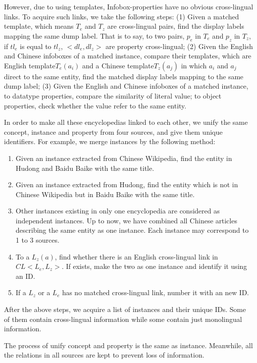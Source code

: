\documentclass[runningheads,a4paper]{llncs}
\begin{document}
However, due to using templates, Infobox-properties have no obvious cross-lingual links. To acquire such links, we take the following steps: (1) Given a matched template, which means $T_{e}$ and $T_{z}$ are cross-lingual pairs, find the display labels mapping the same dump label. That is to say, to two pairs, $p_{e}$ in $T_{e}$ and $p_{z}$ in $T_{z}$, if $tl_{e}$ is equal to $tl_{z}$, $<dl_{e},dl_{z}>$ are property cross-lingual; (2) Given the English and Chinese infoboxes of a matched instance, compare their templates, which are English template$T_{e}(a_{i})$ and a Chinese template$T_{z}(a_{j})$ in which $a_{i}$ and $a_{j}$ direct to the same entity, find the matched display labels mapping to the same dump label; (3) Given the English and Chinese infoboxes of a matched instance, to datatype properties, compare the similarity of literal value; to object properties, check whether the value refer to the same entity. 

In order to make all these encyclopedias linked to each other, we unify the same concept, instance and property from four sources, and give them unique identifiers. For example, we merge instances by the following method:

\begin{enumerate}[Step 1]
    \item Given an instance extracted from Chinese Wikipedia, find the entity in Hudong and Baidu Baike with the same title.
    \item Given an instance extracted from Hudong, find the entity which is not in Chinese Wikipedia but in Baidu Baike with the same title.
    \item Other instances existing in only one encyclopedia are considered as independent instances. Up to now, we have combined all Chinese articles describing the same entity as one instance. Each instance may correspond to 1 to 3 sources.
    \item To a $L_{z}(a)$, find whether there is an English cross-lingual link in $CL<L_{e}, L_{z}>$. If exists, make the two as one instance and identify it using an ID.
    \item If a $L_{z}$ or a $L_{e}$ has no matched cross-lingual link, number it with an new ID.
\end{enumerate}

After the above steps, we acquire a list of instances and their unique IDs. Some of them contain cross-lingual information while some contain just monolingual information.

The process of unify concept and property is the same as instance. Meanwhile, all the relations in all sources are kept to prevent loss of information.
\end{document}
